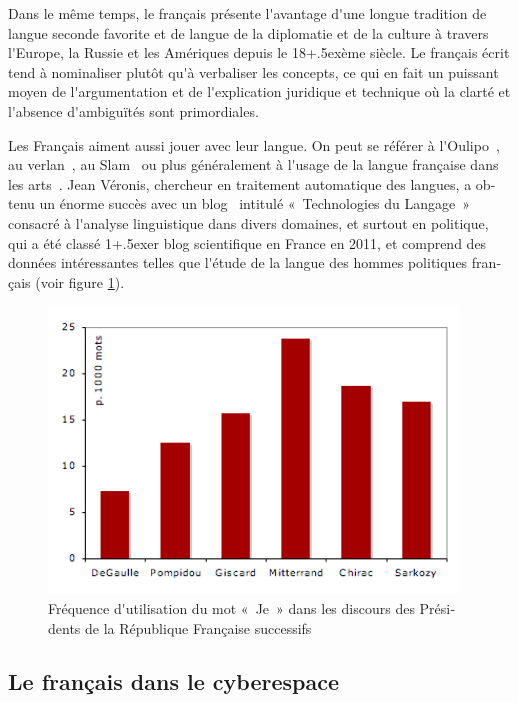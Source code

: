 \documentclass[]{../metanetpaper}
\begin{document}
\begin{french}
\begin{multicols}{2}
Dans le même temps, le français présente l{\mbox '}avantage d{\mbox '}une
longue tradition de langue seconde favorite et de langue de la
diplomatie et de la culture à travers l{\mbox '}Europe, la Russie et
les Amériques depuis le 18\raise+.5ex\hbox{ème} siècle. Le français
écrit tend à nominaliser plutôt qu{\mbox '}à verbaliser les concepts,
ce qui en fait un puissant moyen de l{\mbox '}argumentation et de
l{\mbox '}explication juridique et technique où la clarté et l{\mbox
 '}absence d{\mbox '}ambiguïtés sont primordiales.

Les Français aiment aussi jouer avec leur langue. On peut se référer à
l{\mbox '}Oulipo~\cite{oulipo}, au verlan~\cite{plenat95}, au
Slam~\cite{slam} ou plus généralement à l{\mbox '}usage de la langue
française dans les arts~\cite{arts}. Jean Véronis, chercheur en
traitement automatique des langues, a obtenu un énorme succès avec un
blog~\cite{veronis} intitulé «~Technologies du Langage~» consacré à
l{\mbox '}analyse linguistique dans divers domaines, et surtout en
politique, qui a été classé 1\raise+.5ex\hbox{er} blog scientifique en
France en 2011, et comprend des données intéressantes telles que
l{\mbox '}étude de la langue des hommes politiques français (voir
figure \ref{fig:je_stats}).

\begin{figure}[!ht]
\begin{center}
 \includegraphics[height=3.0in]{../_media/french/french_pix1_freq_je.png} 
  \caption{Fréquence d{\mbox '}utilisation du mot «~Je~» dans les discours des Présidents de la République Française successifs}
  \label{fig:je_stats}
\end{center}
\end{figure}

\subsection{Le français dans le cyberespace}


\end{multicols}
\end{french}
\end{document}
